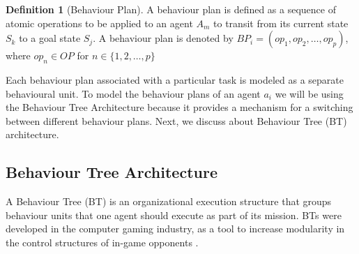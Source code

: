 \documentclass[journal]{IEEEtran}
\theoremstyle{definition}
\newtheorem{definition}{Definition}
\newcommand\patrizio[1]{\nb{Patrizio}{#1}}
\begin{document}
\begin{definition}[Behaviour Plan]  A behaviour plan is defined as a sequence of atomic operations to be applied to an agent $A_m$ to transit from its current state $S_k$ to a goal state $S_j$.  A behaviour plan is denoted by $BP_i= (op_1, op_2, \dots, op_p)$, where $op_n \in OP $ for 
$ n \in \{1,2, \dots, p\} $  
\end{definition}


Each behaviour plan associated with a particular task is modeled as a separate behavioural unit.
To model the behaviour plans of an agent $a_i$ we will be using the Behaviour Tree Architecture because it provides a mechanism for a switching between different behaviour plans. Next, we discuss about Behaviour Tree (BT) architecture.

\subsection{Behaviour Tree Architecture}

A Behaviour Tree (BT) is an organizational execution structure that groups behaviour units that one agent should execute as part of its mission. BTs were developed in the computer gaming industry, as a tool to increase modularity in
the control structures of in-game opponents \cite{colledanchise2017behavior}.





\end{document}
